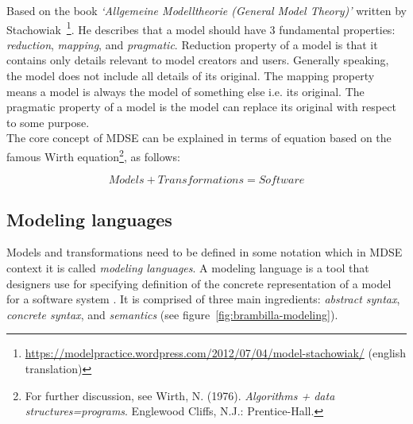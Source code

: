 Based on the book \textit{`Allgemeine Modelltheorie (General Model Theory)'} written by Stachowiak~\cite{Stachowiak}\footnote{ \url{https://modelpractice.wordpress.com/2012/07/04/model-stachowiak/} (english translation)}. He describes that a model should have 3 fundamental properties: \textit{reduction}, \textit{mapping}, and \textit{pragmatic}. Reduction property of a model is that it contains only details relevant to model creators and users. Generally speaking, the model does not include all details of its original. The mapping property means a model is always the model of something else i.e. its original. The pragmatic property of a model is the model can replace its original with respect to some purpose.\\

The core concept of MDSE can be explained in terms of equation based on the famous Wirth equation\footnote{For further discussion, see Wirth, N. (1976). \textit{Algorithms + data structures=programs}. Englewood Cliffs, N.J.: Prentice-Hall.}, as follows: 

\begin{equation}
Models + Transformations = Software
\label{eg:mde}
\end{equation}

\subsection{Modeling languages}
\label{sec:modeling_languages}
Models and transformations need to be defined in some notation which in MDSE context it is called \textit{modeling languages}. A modeling language is a tool that designers use for specifying definition of the concrete representation of a model for a software system \cite{Brambilla}. It is comprised of three main ingredients: \textit{abstract syntax}, \textit{concrete syntax}, and \textit{semantics} (see figure~\ref{fig:brambilla-modeling}). \\

